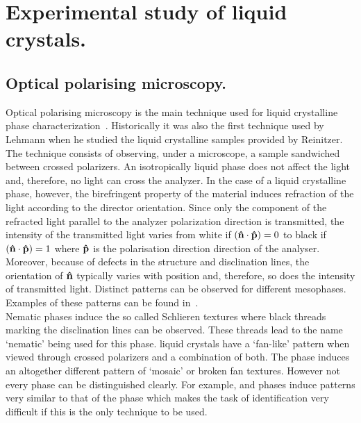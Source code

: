 \section{Experimental study of liquid crystals.}

\subsection{Optical polarising microscopy.}

Optical polarising microscopy is the main technique used for liquid crystalline phase
characterization~\cite{Intro_LC}. Historically it was also the first technique used by Lehmann
when he studied the liquid crystalline samples provided by Reinitzer.\\
The technique consists of observing, under a microscope, a sample sandwiched between crossed polarizers. 
An isotropically liquid phase does not affect the light and, therefore, no
light can cross the analyzer. In the case of a liquid crystalline phase, however, the birefringent 
property of the material induces refraction of the light according to the director orientation. 
Since only the component of the refracted light parallel to the analyzer polarization direction is
transmitted, the intensity of the transmitted light varies from white if
$\left( \mathbf{\hat{n} } \cdot \mathbf{\hat{p} } \right)= 0$ to black if $\left( \mathbf{\hat{n} } \cdot \mathbf{\hat{p} } \right)= 1$ where 
$\mathbf{\hat{p} }$ is the polarisation direction direction of the analyser. Moreover, because of defects 
in the structure and disclination lines, the orientation of $\mathbf{\hat{n} }$ typically varies with 
position and, therefore, so does the intensity of transmitted light.
Distinct patterns can be observed for different mesophases. Examples of these patterns can be
found in~\cite{Nature_phase}.\\
Nematic phases induce the so called Schlieren textures where black threads marking the
disclination lines can be observed. These threads lead to the name `nematic' being used for this
phase. \SmA liquid crystals have a  `fan-like' pattern when viewed through crossed polarizers and 
\smC a combination of both. The \smB phase induces an altogether different pattern of `mosaic' or 
broken fan textures. However not every phase can be distinguished clearly. For example, \smI 
and \smF phases induce patterns very similar to that of the \smC phase which makes the task 
of identification very difficult if this is the only technique to be used.



